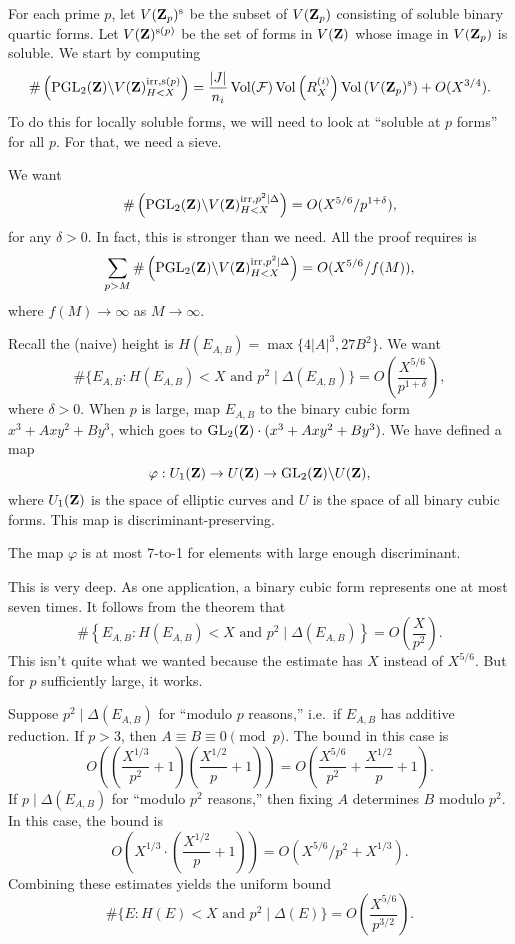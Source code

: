 For each prime $p$, let $V(\mathbf{Z}_p)^\mathrm{s}$ be the subset of $V(\mathbf{Z}_p)$ 
consisting of soluble binary quartic forms. Let $V(\mathbf{Z})^{\mathrm{s}(p)}$ be the 
set of forms in $V(\mathbf{Z})$ whose image in $V(\mathbf{Z}_p)$ is soluble. We start by 
computing 
\[
  \#\left(\operatorname{PGL}_2(\mathbf{Z})\backslash V(\mathbf{Z})_{H<X}^{\mathrm{irr},\mathrm{s}(p)}\right) = \frac{|J|}{n_i} \operatorname{Vol}(\mathcal{F}) \operatorname{Vol}\left(R_X^{(i)}\right) \operatorname{Vol}\left(V(\mathbf{Z}_p)^\mathrm{s}\right) + O(X^{3/4}) .
\]
To do this for locally soluble forms, we will need to look at ``soluble at $p$ 
forms'' for all $p$. For that, we need a sieve. 

We want 
\[
  \#\left(\operatorname{PGL}_2(\mathbf{Z})\backslash V(\mathbf{Z})_{H<X}^{\mathrm{irr},p^2\mid \Delta}\right) = O(X^{5/6}/p^{1+\delta}) ,
\]
for any $\delta>0$. In fact, this is stronger than we need. All the proof 
requires is 
\[
  \sum_{p>M} \#\left(\operatorname{PGL}_2(\mathbf{Z})\backslash V(\mathbf{Z})_{H<X}^{\mathrm{irr},p^2\mid\Delta}\right) = O(X^{5/6}/f(M)) ,
\]
where $f(M)\to \infty$ as $M\to \infty$. 

Recall the (naive) height is $H(E_{A,B}) = \max\{4 |A|^3,27 B^2\}$. 
We want 
\[
  \#\{E_{A,B}:H(E_{A,B})<X\text{ and }p^2\mid \Delta(E_{A,B})\} = O\left(\frac{X^{5/6}}{p^{1+\delta}}\right),
\]
where $\delta>0$. When $p$ is large, map $E_{A,B}$ to the binary cubic form 
$x^3 + A x y^2 + B y^3$, which goes to 
$\operatorname{GL}_2(\mathbf{Z})\cdot (x^3+A x y^2 + B y^3)$. We have defined a map 
\[
  \varphi:U_1(\mathbf{Z}) \to U(\mathbf{Z}) \to \operatorname{GL}_2(\mathbf{Z})\backslash U(\mathbf{Z}) ,
\] 
where $U_1(\mathbf{Z})$ is the space of elliptic curves and $U$ is the space of all 
binary cubic forms. This map is discriminant-preserving. 

\begin{theo}
The map $\varphi$ is at most 7-to-1 for elements with large enough 
discriminant. 
\end{theo}

This is very deep. 
As one application, a binary cubic form represents one at most seven times. 
It follows from the theorem that 
\[
  \#\left\{E_{A,B}:H(E_{A,B})<X\text{ and }p^2\mid \Delta(E_{A,B})\right\} = O\left(\frac{X}{p^2}\right) . 
\]
This isn't quite what we wanted because the estimate has $X$ instead of 
$X^{5/6}$. But for $p$ sufficiently large, it works. 

Suppose $p^2\mid \Delta(E_{A,B})$ for ``modulo $p$ reasons,'' i.e.~if $E_{A,B}$ 
has additive reduction. If $p>3$, then $A\equiv B\equiv 0\pmod p$. The bound in 
this case is 
\[
  O\left(\left(\frac{X^{1/3}}{p^2}+1\right)\left(\frac{X^{1/2}}{p}+1\right)\right) = O\left(\frac{X^{5/6}}{p^2} + \frac{X^{1/2}}{p}+1\right) .
\]
If $p\mid \Delta(E_{A,B})$ for ``modulo $p^2$ reasons,'' then fixing $A$ 
determines $B$ modulo $p^2$. In this case, the bound is 
\[
  O\left(X^{1/3} \cdot\left(\frac{X^{1/2}}{p}+1\right)\right) = O\left(X^{5/6}/p^2 + X^{1/3}\right) .
\]
Combining these estimates yields the uniform bound 
\[
  \#\{E:H(E)<X\text{ and }p^2\mid \Delta(E)\} = O\left(\frac{X^{5/6}}{p^{3/2}}\right) .
\]

